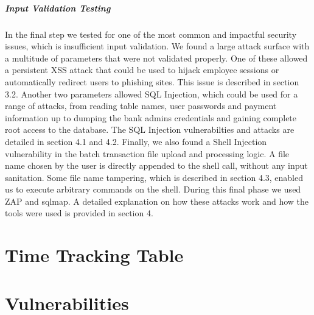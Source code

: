 \documentclass{report}
\begin{document}
\subsubsection{Input Validation Testing}
In the final step we tested for one of the most common and impactful security issues, which is insufficient input validation. We found a large attack surface with a multitude of parameters that were not validated properly. One of these allowed a persistent XSS attack that could be used to hijack employee sessions or automatically redirect users to phishing sites. This issue is described in section 3.2. Another two parameters allowed SQL Injection, which could be used for a range of attacks, from reading table names, user passwords and payment information up to dumping the bank admins credentials and gaining complete root access to the database. The SQL Injection vulnerabilties and attacks are detailed in section 4.1 and 4.2. Finally, we also found a Shell Injection vulnerability in the batch transaction file upload and processing logic. A file name chosen by the user is directly appended to the shell call, without any input sanitation. Some file name tampering, which is described in section 4.3, enabled us to execute arbitrary commands on the shell. During this final phase we used ZAP and sqlmap. A detailed explanation on how these attacks work and how the tools were used is provided in section 4.
\tableofcontents

\part{Time Tracking Table}


\part{Vulnerabilities}



\end{document}
